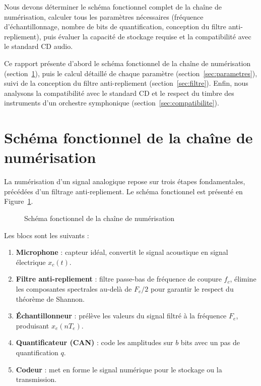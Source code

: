 \documentclass[12pt, a4paper, french]{article}
\newcommand{\Fe}{F_e}
\begin{document}
Nous devons déterminer le schéma fonctionnel complet de la chaîne de numérisation, calculer tous les paramètres nécessaires (fréquence d'échantillonnage, nombre de bits de quantification, conception du filtre anti-repliement), puis évaluer la capacité de stockage requise et la compatibilité avec le standard CD audio.

Ce rapport présente d'abord le schéma fonctionnel de la chaîne de numérisation (section~\ref{sec:schema}), puis le calcul détaillé de chaque paramètre (section~\ref{sec:parametres}), suivi de la conception du filtre anti-repliement (section~\ref{sec:filtre}). Enfin, nous analysons la compatibilité avec le standard CD et le respect du timbre des instruments d'un orchestre symphonique (section~\ref{sec:compatibilite}).

\section{Schéma fonctionnel de la chaîne de numérisation}
\label{sec:schema}

La numérisation d'un signal analogique repose sur trois étapes fondamentales, précédées d'un filtrage anti-repliement. Le schéma fonctionnel est présenté en Figure~\ref{fig:schema}.

\begin{figure}[H]
    \centering
    \caption{Schéma fonctionnel de la chaîne de numérisation}
    \label{fig:schema}
\end{figure}

Les blocs sont les suivants :
\begin{enumerate}
    \item \textbf{Microphone} : capteur idéal, convertit le signal acoustique en signal électrique $x_c(t)$.
    \item \textbf{Filtre anti-repliement} : filtre passe-bas de fréquence de coupure $f_c$, élimine les composantes spectrales au-delà de $\Fe/2$ pour garantir le respect du théorème de Shannon.
    \item \textbf{Échantillonneur} : prélève les valeurs du signal filtré à la fréquence $\Fe$, produisant $x_e(n T_e)$.
    \item \textbf{Quantificateur (CAN)} : code les amplitudes sur $b$ bits avec un pas de quantification $q$.
    \item \textbf{Codeur} : met en forme le signal numérique pour le stockage ou la transmission.
\end{enumerate}
\end{document}
